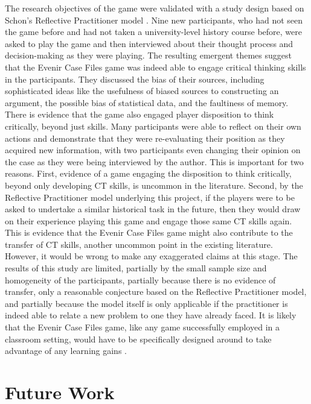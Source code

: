 \documentclass{l4proj}
\begin{document}
The research objectives of the game were validated with a study design based on Schon’s Reflective Practitioner model \citep{schon1984reflective}. Nine new participants, who had not seen the game before and had not taken a university-level history course before, were asked to play the game and then interviewed about their thought process and decision-making as they were playing. The resulting emergent themes suggest that the Evenir Case Files game was indeed able to engage critical thinking skills in the participants. They discussed the bias of their sources, including sophisticated ideas like the usefulness of biased sources to constructing an argument, the possible bias of statistical data, and the faultiness of memory. There is evidence that the game also engaged player disposition to think critically, beyond just skills. Many participants were able to reflect on their own actions and demonstrate that they were re-evaluating their position as they acquired new information, with two participants even changing their opinion on the case as they were being interviewed by the author. This is important for two reasons. First, evidence of a game engaging the disposition to think critically, beyond only developing CT skills, is uncommon in the literature. Second, by the Reflective Practitioner model underlying this project, if the players were to be asked to undertake a similar historical task in the future, then they would draw on their experience playing this game and engage those same CT skills again. This is evidence that the Evenir Case Files game might also contribute to the transfer of CT skills, another uncommon point in the existing literature. However, it would be wrong to make any exaggerated claims at this stage. The results of this study are limited, partially by the small sample size and homogeneity of the participants, partially because there is no evidence of transfer, only a reasonable conjecture based on the Reflective Practitioner model, and partially because the model itself is only applicable if the practitioner is indeed able to relate a new problem to one they have already faced. It is likely that the Evenir Case Files game, like any game successfully employed in a classroom setting, would have to be specifically designed around to take advantage of any learning gains \citep{mccall2016teaching}. 

\section{Future Work}
\end{document}
